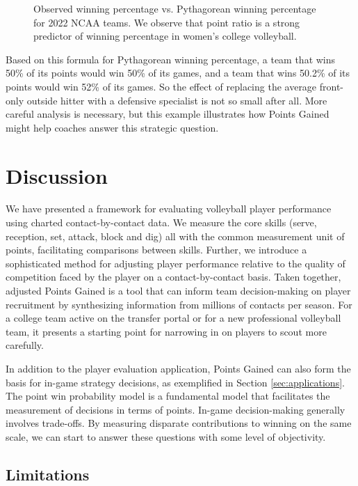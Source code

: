 \documentclass[USenglish]{article}
\theoremstyle{dgthm}
\theoremstyle{dgdef}
\begin{document}
\begin{figure}
    \centering
    \caption{Observed winning percentage vs. Pythagorean winning percentage for 2022 NCAA teams. We observe that point ratio is a strong predictor of winning percentage in women's college volleyball.}
    \label{fig:pythag-games-won}
\end{figure}

Based on this formula for Pythagorean winning percentage, a team that wins 50\% of its points would win 50\% of its games, and a team that wins 50.2\% of its points would win 52\% of its games. So the effect of replacing the average front-only outside hitter with a defensive specialist is not so small after all. More careful analysis is necessary, but this example illustrates how Points Gained might help coaches answer this strategic question.


\section{Discussion}

We have presented a framework for evaluating volleyball player performance using charted contact-by-contact data. We measure the core skills (serve, reception, set, attack, block and dig) all with the common measurement unit of points, facilitating comparisons between skills. Further, we introduce a sophisticated method for adjusting player performance relative to the quality of competition faced by the player on a contact-by-contact basis. Taken together, adjusted Points Gained is a tool that can inform team decision-making on player recruitment by synthesizing information from millions of contacts per season. For a college team active on the transfer portal or for a new professional volleyball team, it presents a starting point for narrowing in on players to scout more carefully.

In addition to the player evaluation application, Points Gained can also form the basis for in-game strategy decisions, as exemplified in Section \ref{sec:applications}. The point win probability model is a fundamental model that facilitates the measurement of decisions in terms of points. In-game decision-making generally involves trade-offs. By measuring disparate contributions to winning on the same scale, we can start to answer these questions with some level of objectivity.


\subsection{Limitations}
\label{sec:limitations}
\end{document}
